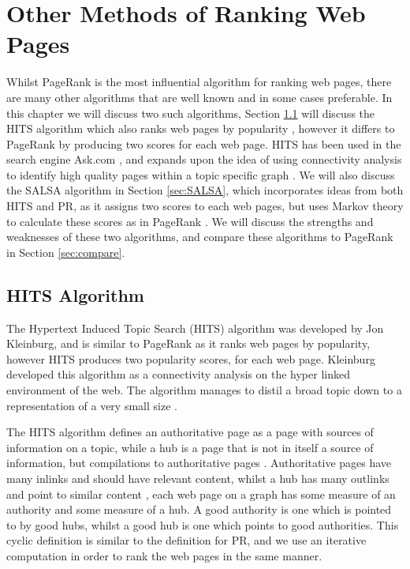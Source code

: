 \documentclass[11pt]{report}
\begin{document}
\chapter{Other Methods of Ranking Web Pages}\label{chap:Other}
Whilst PageRank is the most influential algorithm for ranking web pages, there are many other algorithms that are well known and in some cases preferable. In this chapter we will discuss two such algorithms, Section \ref{sec:HITS} will discuss the HITS algorithm which also ranks web pages by popularity \cite{kleinberg1999authoritative}, however it differs to PageRank by producing two scores for each web page. HITS has been used in the search engine Ask.com \cite{bonato}, and expands upon the idea of using connectivity analysis to identify high quality pages within a topic specific graph \cite{manning}. We will also discuss the SALSA algorithm in Section \ref{sec:SALSA}, which incorporates ideas from both HITS and PR, as it assigns two scores to each web pages, but uses Markov theory to calculate these scores as in PageRank \cite{lempel2000stochastic}. We will discuss the strengths and weaknesses of these two algorithms, and compare these algorithms to PageRank in Section \ref{sec:compare}.

\section{HITS Algorithm} \label{sec:HITS}
The Hypertext Induced Topic Search (HITS) algorithm was developed by Jon Kleinburg, and is similar to PageRank as it ranks web pages by popularity, however HITS produces two popularity scores, for each web page.  Kleinburg developed this algorithm as a connectivity analysis on the hyper linked environment of the web. The algorithm manages to distil a broad topic down to a representation of a very small size \cite{kleinberg1999authoritative}. 

The HITS algorithm defines an authoritative page as a page with sources of information on a topic, while a hub is a page that is not in itself a source of information, but compilations to authoritative pages \cite{manning}. Authoritative pages have many inlinks and should have relevant content, whilst a hub has many outlinks and point to similar content \cite{baeza1999modern}, each web page on a graph has some measure of an authority and some measure of a hub. A good authority is one which is pointed to by good hubs, whilst a good hub is one which points to good authorities. This cyclic definition is similar to the definition for PR, and we use an iterative computation in order to rank the web pages in the same manner.
\end{document}
